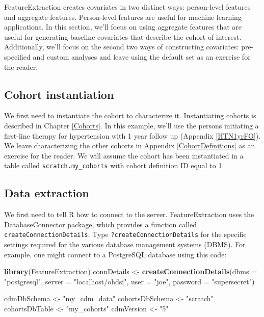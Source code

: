 \documentclass[11pt]{book}
\newenvironment{Shaded}{\begin{snugshade}}{\end{snugshade}}
\newcommand{\DataTypeTok}[1]{\textcolor[rgb]{0.13,0.29,0.53}{#1}}
\newcommand{\KeywordTok}[1]{\textcolor[rgb]{0.13,0.29,0.53}{\textbf{#1}}}
\newcommand{\NormalTok}[1]{#1}
\newcommand{\StringTok}[1]{\textcolor[rgb]{0.31,0.60,0.02}{#1}}
\theoremstyle{definition}
\theoremstyle{definition}
\theoremstyle{definition}
\theoremstyle{remark}
\begin{document}
FeatureExtraction creates covariates in two distinct ways: person-level features and aggregate features. Person-level features are useful for machine learning applications. In this section, we'll focus on using aggregate features that are useful for generating baseline covariates that describe the cohort of interest. Additionally, we'll focus on the second two ways of constructing covariates: pre-specified and custom analyses and leave using the default set as an exercise for the reader.

\hypertarget{cohort-instantiation}{%
\subsection{Cohort instantiation}\label{cohort-instantiation}}

We first need to instantiate the cohort to characterize it. Instantiating cohorts is described in Chapter \ref{Cohorts}. In this example, we'll use the persons initiating a first-line therapy for hypertension with 1 year follow up (Appendix \ref{HTN1yrFO}). We leave characterizing the other cohorts in Appendix \ref{CohortDefinitions} as an exercise for the reader. We will assume the cohort has been instantiated in a table called \texttt{scratch.my\_cohorts} with cohort definition ID equal to 1.

\hypertarget{data-extraction}{%
\subsection{Data extraction}\label{data-extraction}}

We first need to tell R how to connect to the server. FeatureExtraction uses the DatabaseConnector package, which provides a function called \texttt{createConnectionDetails}. Type \texttt{?createConnectionDetails} for the specific settings required for the various database management systems (DBMS). For example, one might connect to a PostgreSQL database using this code:

\begin{Shaded}
\begin{Highlighting}[]
\KeywordTok{library}\NormalTok{(FeatureExtraction)}
\NormalTok{connDetails <-}\StringTok{ }\KeywordTok{createConnectionDetails}\NormalTok{(}\DataTypeTok{dbms =} \StringTok{"postgresql"}\NormalTok{,}
                                       \DataTypeTok{server =} \StringTok{"localhost/ohdsi"}\NormalTok{,}
                                       \DataTypeTok{user =} \StringTok{"joe"}\NormalTok{,}
                                       \DataTypeTok{password =} \StringTok{"supersecret"}\NormalTok{)}

\NormalTok{cdmDbSchema <-}\StringTok{ "my_cdm_data"}
\NormalTok{cohortsDbSchema <-}\StringTok{ "scratch"}
\NormalTok{cohortsDbTable <-}\StringTok{ "my_cohorts"}
\NormalTok{cdmVersion <-}\StringTok{ "5"}
\end{Highlighting}
\end{Shaded}
\end{document}

